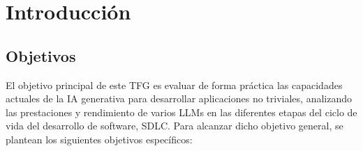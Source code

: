 
\cleardoublepage
\chapter{Introducción} \label{chap:Introduccion}

\section{Objetivos} \label{sec:objetivos}

El objetivo principal de este \ac{TFG} es evaluar de forma práctica las capacidades actuales de la \ac{IA} generativa para desarrollar aplicaciones no triviales, analizando las prestaciones y rendimiento de varios \ac{LLMs} en las diferentes etapas del ciclo de vida del desarrollo de software, \ac{SDLC}. Para alcanzar dicho objetivo general, se plantean los siguientes objetivos específicos:

